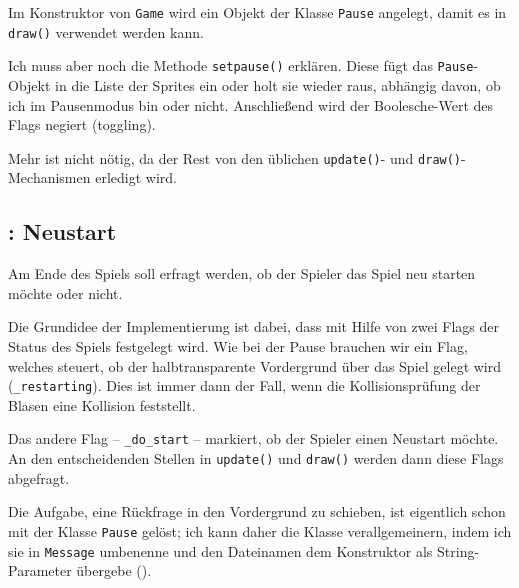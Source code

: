 \newpage
{}  

Im Konstruktor von \texttt{Game} wird ein Objekt der Klasse \texttt{Pause} angelegt, damit es in \texttt{draw()} verwendet werden kann. 


Ich muss aber noch die Methode \texttt{setpause()} erklären. Diese fügt das \texttt{Pause}-Objekt in die Liste der Sprites ein oder holt sie wieder raus, abhängig davon, ob ich im Pausenmodus bin oder nicht. Anschließend wird der Boolesche-Wert des Flags negiert (\gls{toggling}).


Mehr ist nicht nötig, da der Rest von den üblichen \texttt{update()}- und \texttt{draw()}-Mechanismen erledigt wird.

\subsection{: Neustart}
 Am Ende des Spiels soll erfragt werden, ob der Spieler das Spiel neu starten möchte oder nicht.
\er

Die Grundidee der Implementierung ist dabei, dass mit Hilfe von zwei Flags der Status des Spiels festgelegt wird. Wie bei der Pause brauchen wir ein Flag, welches steuert, ob der halbtransparente Vordergrund über das Spiel gelegt wird (\texttt{\_restarting}). Dies ist immer dann der Fall, wenn die Kollisionsprüfung der Blasen eine Kollision feststellt. 

Das andere Flag -- \texttt{\_do\_start} -- markiert, ob der Spieler einen Neustart möchte. An den entscheidenden Stellen in \texttt{update()} und \texttt{draw()} werden dann diese Flags abgefragt.

Die Aufgabe, eine Rückfrage in den Vordergrund zu schieben, ist eigentlich schon mit der Klasse \texttt{Pause} gelöst; ich kann daher die Klasse verallgemeinern, indem ich sie in \texttt{Message} umbenenne und den Dateinamen dem Konstruktor als String-Parameter übergebe ().

